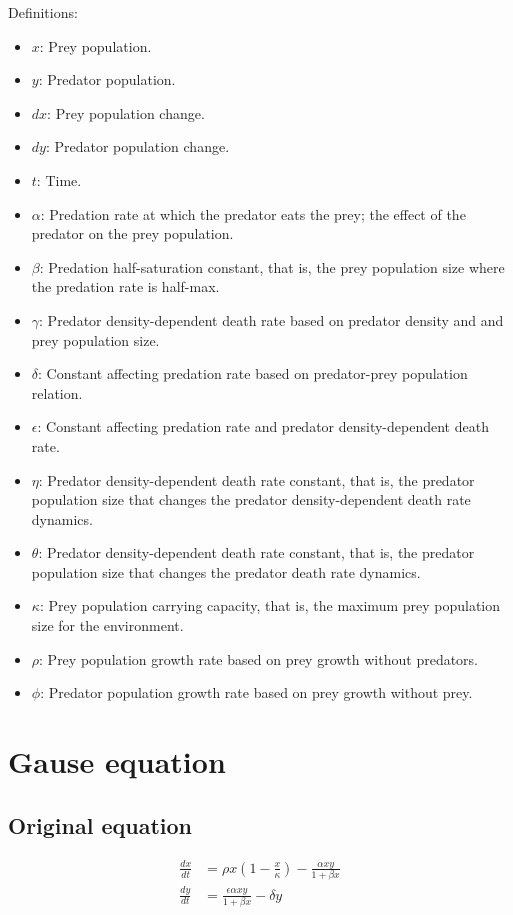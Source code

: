 Definitions:
\begin{itemize}
\item $x$: Prey population.
\item $y$: Predator population.
\item $dx$: Prey population change.
\item $dy$: Predator population change.
\item $t$: Time.
\item $\alpha$: Predation rate at which the predator eats the prey; the effect of the predator on the prey population.
\item $\beta$: Predation half-saturation constant, that is, the prey population size where the predation rate is half-max.
\item $\gamma$: Predator density-dependent death rate based on predator density and and prey population size.
\item $\delta$: Constant affecting predation rate based on predator-prey population relation.
\item $\epsilon$: Constant affecting predation rate and predator density-dependent death rate.
\item $\eta$: Predator density-dependent death rate constant, that is, the predator population size that changes the predator density-dependent death rate dynamics.
\item $\theta$: Predator density-dependent death rate constant, that is, the predator population size that changes the predator death rate dynamics.
\item $\kappa$: Prey population carrying capacity, that is, the maximum prey population size for the environment.
\item $\rho$: Prey population growth rate based on prey growth without predators.
\item $\phi$: Predator population growth rate based on prey growth without prey.
\end{itemize}

\section{Gause equation}
\subsection{Original equation}
\begin{equation*}
\begin{split}
\frac{dx}{dt} &= \rho x \left(1 - \frac{x}{\kappa}\right) - \frac{\alpha xy}{1 + \beta x} \\
\frac{dy}{dt} &= \frac{\epsilon \alpha xy}{1 + \beta x} - \delta y
\end{split}
\end{equation*}

